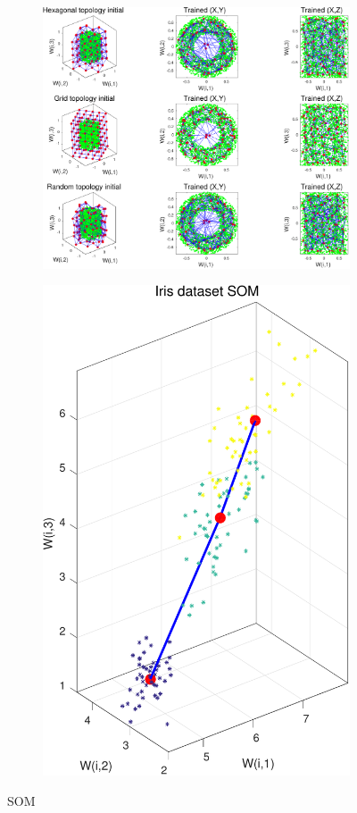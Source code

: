 \documentclass[11pt, a4paper]{article}
\begin{document}
\begin{figure}[H]
    \centering
    \begin{subfigure}{.7\textwidth}
      \centering
      \includegraphics[width=0.8\linewidth]{SOM_cylinder.pdf}
    \end{subfigure}%
    \begin{subfigure}{.3\textwidth}
      \centering
      \includegraphics[width=0.9\linewidth]{SOM_iris.pdf}
    \end{subfigure}
    \caption{SOM}
    \label{fig:som}
\end{figure}
\end{document}

